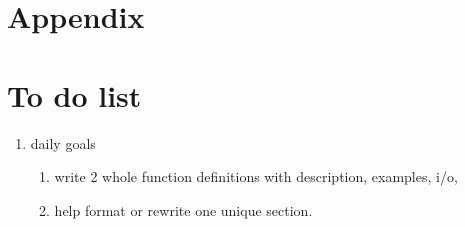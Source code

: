  \section{Appendix}
\section{To do list}
\begin{enumerate}
	\item daily goals
	\begin{enumerate}
		\item write 2 whole function definitions with description, examples, i/o, 
		\item help format or rewrite one unique section. 
	\end{enumerate}
\end{enumerate}


